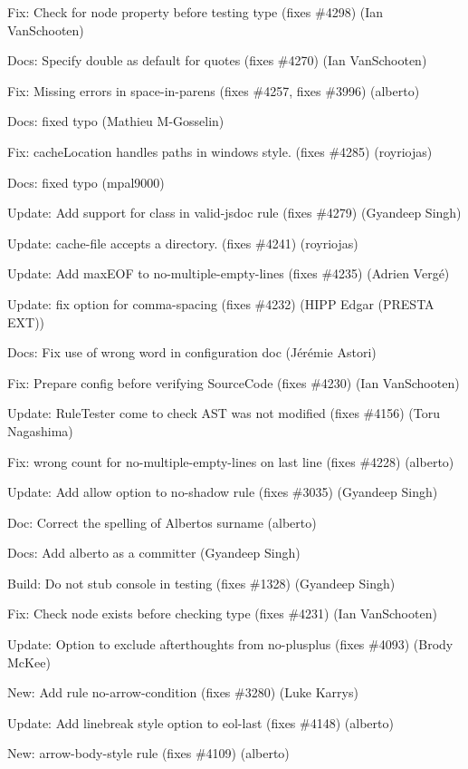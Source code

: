 \begin{DoxyItemize}
\item Fix\+: Check for node property before testing type (fixes \#4298) (Ian Van\+Schooten)
\item Docs\+: Specify \textquotesingle{}double\textquotesingle{} as default for quotes (fixes \#4270) (Ian Van\+Schooten)
\item Fix\+: Missing errors in space-\/in-\/parens (fixes \#4257, fixes \#3996) (alberto)
\item Docs\+: fixed typo (Mathieu M-\/\+Gosselin)
\item Fix\+: {\ttfamily cache\+Location} handles paths in windows style. (fixes \#4285) (royriojas)
\item Docs\+: fixed typo (mpal9000)
\item Update\+: Add support for class in {\ttfamily valid-\/jsdoc} rule (fixes \#4279) (Gyandeep Singh)
\item Update\+: cache-\/file accepts a directory. (fixes \#4241) (royriojas)
\item Update\+: Add {\ttfamily max\+E\+OF} to no-\/multiple-\/empty-\/lines (fixes \#4235) (Adrien Vergé)
\item Update\+: fix option for comma-\/spacing (fixes \#4232) (H\+I\+PP Edgar (P\+R\+E\+S\+TA E\+XT))
\item Docs\+: Fix use of wrong word in configuration doc (Jérémie Astori)
\item Fix\+: Prepare config before verifying Source\+Code (fixes \#4230) (Ian Van\+Schooten)
\item Update\+: Rule\+Tester come to check A\+ST was not modified (fixes \#4156) (Toru Nagashima)
\item Fix\+: wrong count for \textquotesingle{}no-\/multiple-\/empty-\/lines\textquotesingle{} on last line (fixes \#4228) (alberto)
\item Update\+: Add {\ttfamily allow} option to {\ttfamily no-\/shadow} rule (fixes \#3035) (Gyandeep Singh)
\item Doc\+: Correct the spelling of Alberto\textquotesingle{}s surname (alberto)
\item Docs\+: Add alberto as a committer (Gyandeep Singh)
\item Build\+: Do not stub console in testing (fixes \#1328) (Gyandeep Singh)
\item Fix\+: Check node exists before checking type (fixes \#4231) (Ian Van\+Schooten)
\item Update\+: Option to exclude afterthoughts from no-\/plusplus (fixes \#4093) (Brody Mc\+Kee)
\item New\+: Add rule no-\/arrow-\/condition (fixes \#3280) (Luke Karrys)
\item Update\+: Add linebreak style option to eol-\/last (fixes \#4148) (alberto)
\item New\+: arrow-\/body-\/style rule (fixes \#4109) (alberto)
\end{DoxyItemize}

